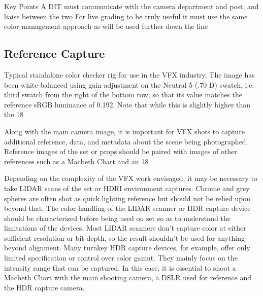 Key Points
A DIT must communicate with the camera department and post, and liaise between the two
For live grading to be truly useful it must use the same color management approach as will be used further down the line

\subsection{Reference Capture}


Typical standalone color checker rig for use in the VFX industry. The image has been white-balanced using gain adjustment on the Neutral 5 (.70 D) swatch, i.e. third swatch from the right of the bottom row, so that its value matches the reference sRGB luminance of 0.192. Note that while this is slightly higher than the 18%

Along with the main camera image, it is important for VFX shots to capture additional reference, data, and metadata about the scene being photographed. Reference images of the set or props should be paired with images of other references such as a Macbeth Chart and an 18%

Depending on the complexity of the VFX work envisaged, it may be necessary to take LIDAR scans of the set or HDRI environment captures. Chrome and grey spheres are often shot as quick lighting reference but should not be relied upon beyond that. The color handling of the LIDAR scanner or HDR capture device should be characterized before being used on set so as to understand the limitations of the devices. Most LIDAR scanners don’t capture color at either sufficient resolution or bit depth, so the result shouldn’t be used for anything beyond alignment. Many turnkey HDR capture devices, for example, offer only limited specification or control over color gamut. They mainly focus on the intensity range that can be captured. In this case, it is essential to shoot a Macbeth Chart with the main shooting camera, a DSLR used for reference and the HDR capture camera.

